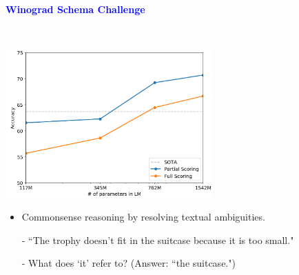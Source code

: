 \documentclass[professionalfont]{beamer}
\begin{document}
\begin{frame}

\begin{center}
    { \textbf{\textcolor{blue}{ {\fontsize{12}{14}\selectfont Winograd Schema Challenge} }} }
\end{center}
\\[0.3cm]
\begin{center}
    \includegraphics[width=0.6\textwidth]{figure3.png}
\end{center}

{\fontsize{10}{14}\selectfont 
\begin{itemize}
    \item Commonsense reasoning by resolving textual ambiguities.
    
    - ``The trophy doesn't fit in the suitcase because it is too small."
    
    - What does `it' refer to? (Answer: ``the suitcase.")

\end{itemize}
}

\end{frame}
\end{document}

